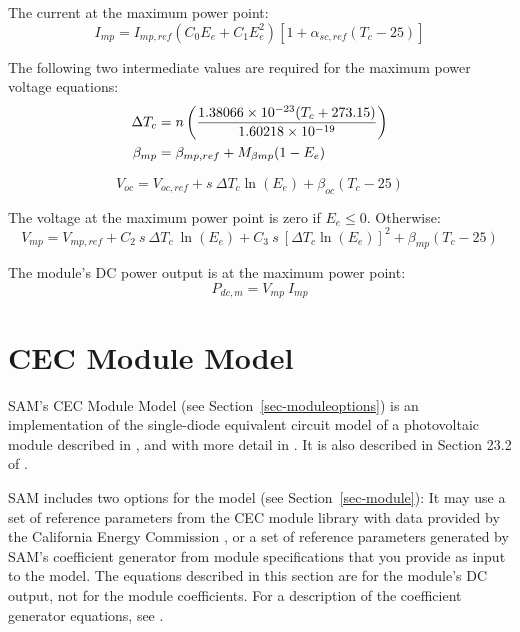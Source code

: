 \documentclass[12pt,letterpaper]{article}
\begin{document}
The current at the maximum power point:
\begin{equation}
I_{mp} = I_{mp,ref} (C_0 E_e + C_1 E_e^2) \left[1 + \alpha_{sc,ref} (T_c - 25)\right]
\end{equation}

The following two intermediate values are required for the maximum power voltage equations:
\begin{align}
\Delta T_c &= n \left(\frac{1.38066\times10^{-23} (T_c + 273.15)}{1.60218\times10^{-19}}\right) \notag\\
\beta_{mp} & = \beta_{mp,ref} + M_{\beta mp} (1 - E_e)
\end{align}

\begin{equation}
V_{oc} = V_{oc,ref}+ s~\Delta T_c \ln(E_e)+ \beta_{oc} (T_c - 25)
\end{equation}

The voltage at the maximum power point is zero if $E_e \leq 0$. Otherwise:
\begin{equation}
V_{mp} = V_{mp,ref} +
 C_2~s~\Delta T_c~\ln(E_e) +
 C_3~s~\left[\Delta T_c \ln(E_e)\right]^2 +
 \beta_{mp} (T_c - 25)
\end{equation}

The module's DC power output is at the maximum power point:
\begin{equation}
P_{dc,m} = V_{mp}~I_{mp}
\end{equation}

\section{CEC Module Model}\label{sec-cecmodule}

SAM's CEC Module Model  (see Section~\ref{sec-moduleoptions}) is an implementation of the single-diode equivalent circuit model of a photovoltaic module described in \citet{desoto2004a}, and with more detail in \citet{desoto2004b}. It is also described in Section 23.2 of  \citet{duffie2013}.

SAM includes two options for the model (see Section~\ref{sec-module}): It may use a set of reference parameters from the CEC module library with data provided by the California Energy Commission \citep{gsc2014a}, or a set of reference parameters generated by SAM's coefficient generator from module specifications that you provide as input to the model. The equations described in this section are for the module's DC output, not for the module coefficients. For a description of the coefficient generator equations, see \citet{dobos2012a}. 
\end{document}
